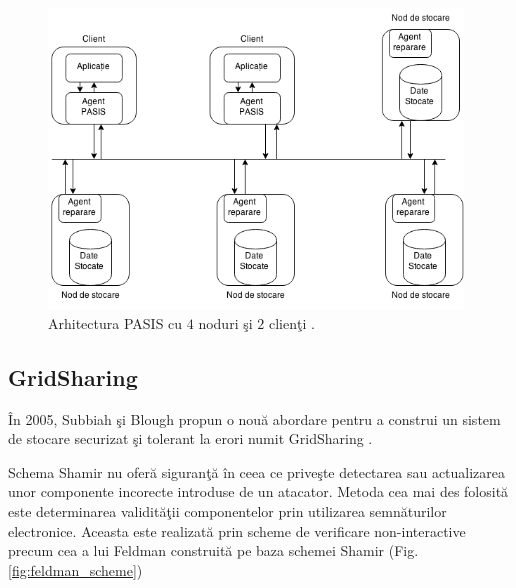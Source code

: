 \documentclass{llncs}
\begin{document}
\begin{figure}
	\includegraphics[width=11cm]{img/PASIS.png}
	\caption{Arhitectura PASIS cu $4$ noduri \c{s}i $2$ clien\c{t}i \cite{W:2000}.}
	\label{fig:pasis}
	\bigskip
\end{figure}

\subsection{GridSharing} 
\label{sec:desc_gridsharing}

\^{I}n 2005, Subbiah \c{s}i Blough propun o nou\u{a} abordare pentru a construi un sistem de stocare securizat \c{s}i tolerant la erori numit GridSharing \cite{SB:2005}.

Schema Shamir nu ofer\u{a} siguran\c{t}\u{a} \^{i}n ceea ce prive\c{s}te detectarea sau actualizarea unor componente incorecte introduse de un atacator. Metoda cea mai des folosit\u{a} este determinarea validit\u{a}\c{t}ii componentelor prin utilizarea semn\u{a}turilor electronice. Aceasta este realizat\u{a} prin scheme de verificare non-interactive precum cea a lui Feldman construit\u{a} pe baza schemei Shamir \cite{Feldman:1987} (Fig. \ref{fig:feldman_scheme})
\end{document}
